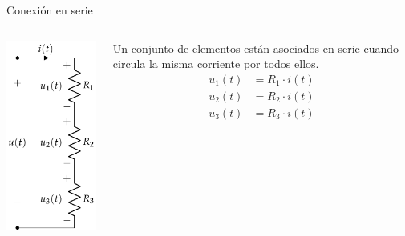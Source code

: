 \documentclass[xcolor={usenames,svgnames,dvipsnames}]{beamer}
\begin{document}
\begin{frame}[label={sec:org6164292}]{Conexión en serie}
\begin{columns}
\begin{column}{0.3\columnwidth}
\begin{center}
\includegraphics[width=.9\linewidth]{figs/AsociacionSerie.pdf}
\end{center}
\end{column}
\begin{column}{0.7\columnwidth}
Un conjunto de elementos están asociados en serie cuando circula la misma corriente por todos ellos.
\begin{align*}
  u_1(t) &= R_1 \cdot i(t)\\
  u_2(t) &= R_2 \cdot i(t)\\
  u_3(t) &= R_3 \cdot i(t)
\end{align*}
\end{column}
\end{columns}
\end{frame}
\end{document}
